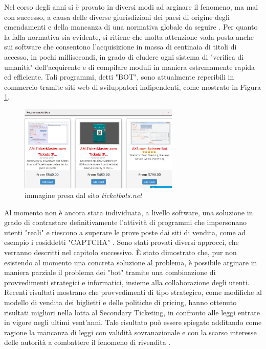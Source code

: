 Nel corso degli anni si è provato in diversi modi ad arginare il fenomeno, ma mai con successo, a causa delle diverse giurisdizioni dei paesi di origine degli emendamenti e della mancanza di una normativa globale da seguire \cite{tompkins2018ticket, elefant2018beyond}. 
Per quanto la falla normativa sia evidente, si ritiene che molta attenzione vada posta anche sui software che consentono l'acquisizione in massa di centinaia di titoli di accesso, in pochi millisecondi, in grado di eludere ogni sistema di "verifica di umanità" dell'acquirente e di compilare moduli in maniera estremamente rapida ed efficiente. Tali programmi, detti "BOT", sono attualmente reperibili in commercio tramite siti web di sviluppatori indipendenti, come mostrato in Figura \ref{buybot}.
\begin{figure}[H]
	\centering
	\includegraphics[width=0.68\textwidth]{chapter2/immagini/buybot}
	\caption{immagine presa dal sito \textit{ticketbots.net}}
	\label{buybot}
\end{figure}
Al momento non è ancora stata individuata, a livello software, una soluzione in grado di contrastare definitivamente l'attività di programmi che impersonano utenti "reali" e riescono a superare le prove poste dai siti di vendita, come ad esempio i cosiddetti "CAPTCHA" . Sono stati provati diversi approcci, che verranno descritti nel capitolo successivo. \`E stato dimostrato che, pur non esistendo al momento una concreta soluzione al problema, è possibile arginare in maniera parziale il problema dei "bot" tramite una combinazione di provvedimenti strategici e informatici, insieme alla collaborazione degli utenti. 
Recenti risultati mostrano che provvedimenti di tipo strategico, come modifiche al modello di vendita dei biglietti e delle politiche di pricing, hanno ottenuto risultati migliori nella lotta al Secondary Ticketing, in confronto alle leggi entrate in vigore negli ultimi vent'anni. 
Tale risultato può essere spiegato additando come ragione la mancanza di leggi con validità sovranazionale e con la scarso interesse delle autorità a combattere il fenomeno di rivendita \cite{drayer2011examining}.
